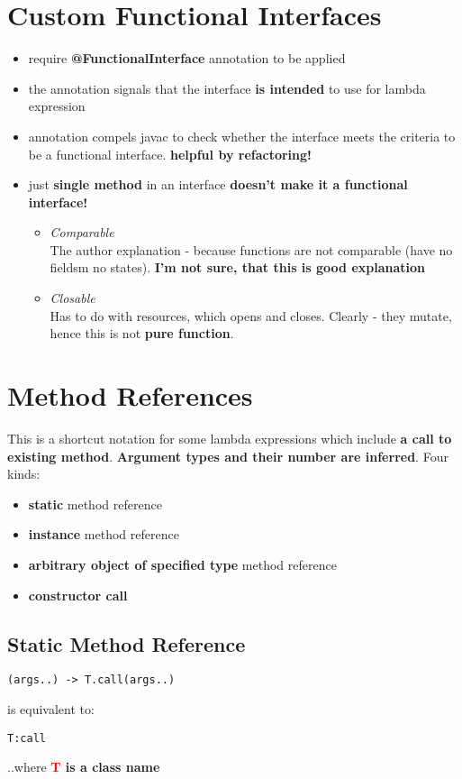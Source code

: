 \documentclass{report}
\begin{document}
\section{Custom Functional Interfaces}
\begin{itemize}
	\item require \textbf{@FunctionalInterface} annotation to be applied
	\item  the annotation signals that the interface \textbf{is intended} to use for lambda expression
	\item annotation compels javac to check whether the interface meets the criteria to be a functional interface. \textbf{helpful by refactoring!}
	\item just \textbf{single method} in an interface \textbf{doesn't make it a functional interface!}
	\begin{itemize}
		\item \textit{Comparable}\\
		The author explanation - because functions are not comparable (have no fieldsm no states). \textbf{I'm not sure, that this is good explanation}
		\item \textit{Closable}\\
		Has to do with resources, which opens and closes. Clearly - they mutate, hence this is not \textbf{pure function}.
	\end{itemize}
\end{itemize}

\section{Method References}
This is a shortcut notation for some lambda expressions which include \textbf{a call to existing method}. \textbf{Argument types and their number are inferred}.
Four kinds:
\begin{itemize}
	\item \textbf{static} method reference
	\item \textbf{instance} method reference 
	\item \textbf{arbitrary object of specified type} method reference
	\item \textbf{constructor call}
\end{itemize}

\subsection{Static Method Reference}
\begin{verbatim}
(args..) -> T.call(args..)
\end{verbatim}
is equivalent to:
\begin{verbatim}
T:call
\end{verbatim}
..where \textbf{\textcolor{red}{T} is a class name}
\end{document}
